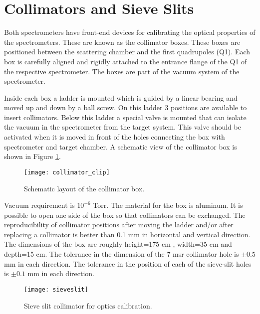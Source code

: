 \section{Collimators and Sieve Slits}

Both spectrometers have front-end devices for calibrating the optical
properties of the spectrometers. These are known as the collimator boxes.
These boxes are positioned between the scattering chamber and the 
first quadrupoles (Q1). Each box is carefully aligned and rigidly attached
to the  entrance flange of the Q1 of the respective spectrometer.  The boxes are
part of the vacuum system of the spectrometer.


Inside each box a ladder is mounted which is guided by a linear bearing
and moved up and down by a ball screw. On this ladder 3 positions are 
available to insert collimators. Below this ladder
a special valve is mounted that can isolate the vacuum in the spectrometer
from the target system. This valve should be activated when it is moved
in front of the holes connecting the box with spectrometer and target chamber.
A schematic view of the collimator box is shown in Figure \ref{fig:coll}.

\begin{figure}
\begin{center}
\texttt{[image: collimator\_clip]}
{\linespread{1.}
\caption[Spectrometers: Collimator Box Schematic]{Schematic layout of the collimator box.}
\label{fig:coll}}
\end{center}
\end{figure}

Vacuum requirement is $10^{-6}$ Torr. The material for the box is 
aluminum. It is possible to open one side of the box so that
collimators can be exchanged. The
reproducibility of collimator positions after moving
the ladder and/or after replacing a collimator is
better than 0.1 mm in horizontal and vertical direction.
The dimensions of the box are
roughly height=175 cm , width=35 cm and depth=15 cm.
The tolerance in the dimension
of the 7 msr collimator hole is $\pm0.5$ mm in each direction. 
The tolerance in the position
of each of the sieve-slit holes is $\pm0.1$ mm in each direction.

\begin{figure}
\begin{center}
\texttt{[image: sieveslit]}
{\linespread{1.}
\caption[Spectrometers: Sieve Slit]{Sieve slit collimator for optics calibration.}
\label{fig:sieve}}
\end{center}
\end{figure}

